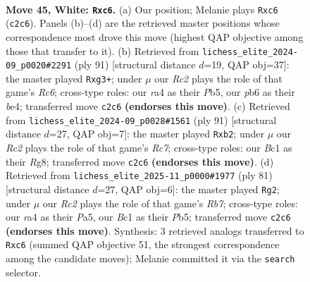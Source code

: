 \documentclass[11pt]{article}
\begin{document}
\clearpage

\begin{figure}[p]\centering
\begin{subfigure}{0.46\textwidth}\centering
\resizebox{\linewidth}{!}{%
\newchessgame
\chessboard[
  setfen={7r/4k3/1pp3p1/6p1/rp1PK3/8/2R5/2B5 w - - 0 45},
  showmover=false,
  pgfstyle=straightmove, color=movearrow, markmove={c2-c6}
]}
\caption{}
\end{subfigure}\hfill
\begin{subfigure}{0.46\textwidth}\centering
\resizebox{\linewidth}{!}{%
\newchessgame
\chessboard[
  setfen={8/p3k3/4b3/1p2P1K1/4B3/2r3P1/P2R4/8 b - - 0 46},
  showmover=false,
  pgfstyle=straightmove, color=movearrow, markmove={c3-g3}
]}
\caption{}
\end{subfigure}
\\[4pt]
\begin{subfigure}{0.46\textwidth}\centering
\resizebox{\linewidth}{!}{%
\newchessgame
\chessboard[
  setfen={6r1/8/1k3P1K/5R2/2p4P/6P1/1Pr5/8 b - - 0 46},
  showmover=false,
  pgfstyle=straightmove, color=movearrow, markmove={c2-b2}
]}
\caption{}
\end{subfigure}\hfill
\begin{subfigure}{0.46\textwidth}\centering
\resizebox{\linewidth}{!}{%
\newchessgame
\chessboard[
  setfen={2k5/2P5/8/pp6/7P/3K2P1/Pr6/2R5 b - - 0 41},
  showmover=false,
  pgfstyle=straightmove, color=movearrow, markmove={b2-g2}
]}
\caption{}
\end{subfigure}
\caption{\textbf{Move 45, White: \texttt{Rxc6}.} (a) Our position; Melanie plays \texttt{Rxc6} (\texttt{c2c6}). Panels (b)--(d) are the retrieved master positions whose correspondence most drove this move (highest QAP objective among those that transfer to it). (b) Retrieved from \texttt{lichess\_elite\_2024-09\_p0020\#2291} (ply 91) [structural distance $d$=19, QAP obj=37]: the master played \texttt{Rxg3+}; under $\mu$ our \emph{Rc2} plays the role of that game's \emph{Rc6}; cross-type roles: our \emph{r}a4 as their \emph{P}b5, our \emph{p}b6 as their \emph{b}e4; transferred move \texttt{c2c6} \textbf{(endorses this move)}. (c) Retrieved from \texttt{lichess\_elite\_2024-09\_p0028\#1561} (ply 91) [structural distance $d$=27, QAP obj=7]: the master played \texttt{Rxb2}; under $\mu$ our \emph{Rc2} plays the role of that game's \emph{Rc7}; cross-type roles: our \emph{B}c1 as their \emph{R}g8; transferred move \texttt{c2c6} \textbf{(endorses this move)}. (d) Retrieved from \texttt{lichess\_elite\_2025-11\_p0000\#1977} (ply 81) [structural distance $d$=27, QAP obj=6]: the master played \texttt{Rg2}; under $\mu$ our \emph{Rc2} plays the role of that game's \emph{Rb7}; cross-type roles: our \emph{r}a4 as their \emph{P}a5, our \emph{B}c1 as their \emph{P}b5; transferred move \texttt{c2c6} \textbf{(endorses this move)}. Synthesis: 3 retrieved analogs transferred to \texttt{Rxc6} (summed QAP objective 51, the strongest correspondence among the candidate moves); Melanie committed it via the \texttt{search} selector.}
\label{fig:thought-m88}
\end{figure}
\end{document}

